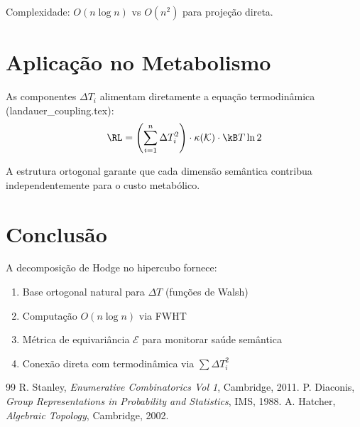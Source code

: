 \documentclass[11pt,a4paper]{article}
\newcommand{\DeltaT}{\Delta T}
\begin{document}
Complexidade: $O(n \log n)$ vs $O(n^2)$ para projeção direta.

\section{Aplicação no Metabolismo}

As componentes $\DeltaT_i$ alimentam diretamente a equação termodinâmica (landauer\_coupling.tex):
\begin{equation}
    \RL = \left( \sum_{i=1}^n \DeltaT_i^2 \right) \cdot \kappa(\mathcal{K}) \cdot \kB T \ln 2
\end{equation}

A estrutura ortogonal garante que cada dimensão semântica contribua independentemente para o custo metabólico.

\section{Conclusão}

A decomposição de Hodge no hipercubo fornece:
\begin{enumerate}
    \item Base ortogonal natural para $\DeltaT$ (funções de Walsh)
    \item Computação $O(n \log n)$ via FWHT
    \item Métrica de equivariância $\mathcal{E}$ para monitorar saúde semântica
    \item Conexão direta com termodinâmica via $\sum \DeltaT_i^2$
\end{enumerate}


\begin{thebibliography}{99}
 R. Stanley, \textit{Enumerative Combinatorics Vol 1}, Cambridge, 2011.
 P. Diaconis, \textit{Group Representations in Probability and Statistics}, IMS, 1988.
 A. Hatcher, \textit{Algebraic Topology}, Cambridge, 2002.
\end{thebibliography}
\end{document}

